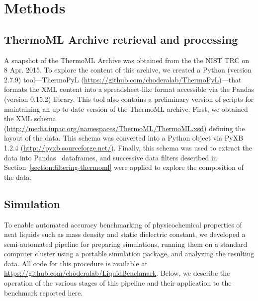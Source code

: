 \documentclass[journal=jacsat,manuscript=article]{achemso}
\begin{document}

\section{Methods}
\label{section:methods}

\subsection{ThermoML Archive retrieval and processing}
\label{section:thermoml-archive-retrieval}


A snapshot of the ThermoML Archive was obtained from the the NIST TRC on 8 Apr. 2015.
To explore the content of this archive, we created a Python (version 2.7.9) tool---ThermoPyL (\url{https://github.com/choderalab/ThermoPyL})---that formats the XML content into a spreadsheet-like format accessible via the Pandas (version 0.15.2) library.
This tool also contains a preliminary version of scripts for maintaining an up-to-date version of the ThermoML archive.
First, we obtained the XML schema (\url{http://media.iupac.org/namespaces/ThermoML/ThermoML.xsd}) defining the layout of the data.
This schema was converted into a Python object via PyXB 1.2.4 (\url{http://pyxb.sourceforge.net/}).
Finally, this schema was used to extract the data into Pandas~\cite{pandas} dataframes, and successive data filters described in Section~\ref{section:filtering-thermoml} were applied to explore the composition of the data.

\subsection{Simulation}
\label{section:simulation}

To enable automated accuracy benchmarking of physicochemical properties of neat liquids such as mass density and static dielectric constant, we developed a semi-automated pipeline for preparing simulations, running them on a standard computer cluster using a portable simulation package, and analyzing the resulting data.
All code for this procedure is available at  \url{https://github.com/choderalab/LiquidBenchmark}.
Below, we describe the operation of the various stages of this pipeline and their application to the benchmark reported here.
\end{document}
